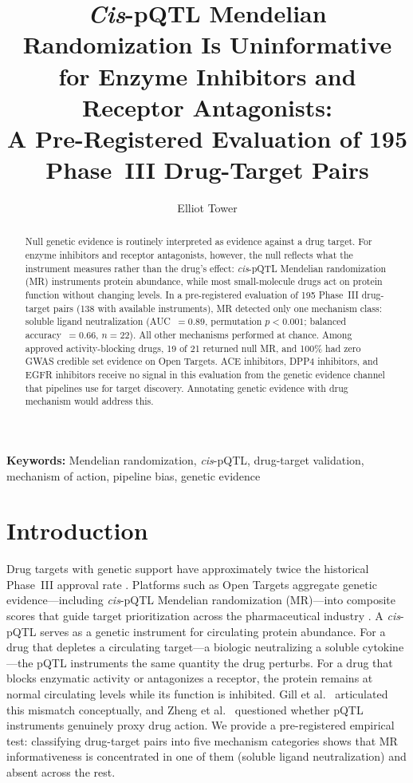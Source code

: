 \documentclass[11pt]{article}
\title{\emph{Cis}-pQTL Mendelian Randomization Is Uninformative for Enzyme Inhibitors and Receptor Antagonists:\\A Pre-Registered Evaluation of 195 Phase~III Drug-Target Pairs}
\author{Elliot Tower}
\affil{Independent Researcher \\ \texttt{elliot@elliottower.ai}}
\date{}
\begin{document}
\linenumbers
\maketitle

\begin{abstract}
Null genetic evidence is routinely interpreted as evidence against a drug target. For enzyme inhibitors and receptor antagonists, however, the null reflects what the instrument measures rather than the drug's effect: \emph{cis}-pQTL Mendelian randomization (MR) instruments protein abundance, while most small-molecule drugs act on protein function without changing levels. In a pre-registered evaluation of 195 Phase~III drug-target pairs (138 with available instruments), MR detected only one mechanism class: soluble ligand neutralization (AUC~$= 0.89$, permutation $p < 0.001$; balanced accuracy~$= 0.66$, $n = 22$). All other mechanisms performed at chance. Among approved activity-blocking drugs, 19 of 21 returned null MR, and 100\% had zero GWAS credible set evidence on Open Targets. ACE inhibitors, DPP4 inhibitors, and EGFR inhibitors receive no signal in this evaluation from the genetic evidence channel that pipelines use for target discovery. Annotating genetic evidence with drug mechanism would address this.
\end{abstract}

\noindent\textbf{Keywords:} Mendelian randomization, \emph{cis}-pQTL, drug-target validation, mechanism of action, pipeline bias, genetic evidence

\section{Introduction}
\label{sec:intro}

Drug targets with genetic support have approximately twice the historical Phase~III approval rate \cite{nelson2015support, king2019greater, minikel2024refining, schmidt2020genetic, trajanoska2023target}. Platforms such as Open Targets aggregate genetic evidence---including \emph{cis}-pQTL Mendelian randomization (MR)---into composite scores that guide target prioritization across the pharmaceutical industry \cite{ochoa2021opentargets, trajanoska2025genomics}. A \emph{cis}-pQTL serves as a genetic instrument for circulating protein abundance. For a drug that depletes a circulating target---a biologic neutralizing a soluble cytokine---the pQTL instruments the same quantity the drug perturbs. For a drug that blocks enzymatic activity or antagonizes a receptor, the protein remains at normal circulating levels while its function is inhibited. Gill et al.\ \cite{gill2021mendelian} articulated this mismatch conceptually, and Zheng et al.\ \cite{zheng2023instrumenting} questioned whether pQTL instruments genuinely proxy drug action. We provide a pre-registered empirical test: classifying drug-target pairs into five mechanism categories shows that MR informativeness is concentrated in one of them (soluble ligand neutralization) and absent across the rest.
\end{document}
